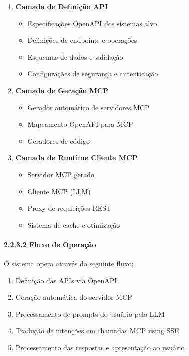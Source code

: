 \documentclass[
]{article}
\providecommand{\tightlist}{%
  \setlength{\itemsep}{0pt}\setlength{\parskip}{0pt}}
\begin{document}
\begin{enumerate}
\def\labelenumi{\arabic{enumi}.}
\tightlist
\item
  \textbf{Camada de Definição API}

  \begin{itemize}
  \tightlist
  \item
    Especificações OpenAPI dos sistemas alvo
  \item
    Definições de endpoints e operações
  \item
    Esquemas de dados e validação
  \item
    Configurações de segurança e autenticação
  \end{itemize}
\item
  \textbf{Camada de Geração MCP}

  \begin{itemize}
  \tightlist
  \item
    Gerador automático de servidores MCP
  \item
    Mapeamento OpenAPI para MCP
  \item
    Geradores de código
  \end{itemize}
\item
  \textbf{Camada de Runtime Cliente MCP}

  \begin{itemize}
  \tightlist
  \item
    Servidor MCP gerado
  \item
    Cliente MCP (LLM)
  \item
    Proxy de requisições REST
  \item
    Sistema de cache e otimização
  \end{itemize}
\end{enumerate}

\paragraph{2.2.3.2 Fluxo de Operação}\label{fluxo-de-operauxe7uxe3o}

O sistema opera através do seguinte fluxo:

\begin{enumerate}
\def\labelenumi{\arabic{enumi}.}
\tightlist
\item
  Definição das APIs via OpenAPI
\item
  Geração automática do servidor MCP
\item
  Processamento de prompts do usuário pelo LLM
\item
  Tradução de intenções em chamadas MCP using SSE
\item
  Processamento das respostas e apresentação ao usuário
\end{enumerate}
\end{document}

